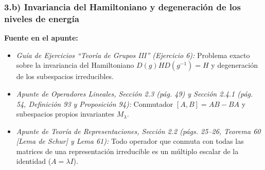 \documentclass[11pt, a4paper]{article}
\begin{document}
\subsubsection*{3.b) Invariancia del Hamiltoniano y degeneración de los niveles de energía}
\textbf{Fuente en el apunte:}
\begin{itemize}
    \item \textit{Guía de Ejercicios ``Teoría de Grupos III'' (Ejercicio 6):} Problema exacto sobre la invariancia del Hamiltoniano $D(g) H D(g^{-1}) = H$ y degeneración de los subespacios irreducibles.
    \item \textit{Apunte de Operadores Lineales, Sección 2.3 (pág. 49) y Sección 2.4.1 (pág. 54, Definición 93 y Proposición 94):} Conmutador $[A, B] = AB - BA$ y subespacios propios invariantes $M_\lambda$.
    \item \textit{Apunte de Teoría de Representaciones, Sección 2.2 (págs. 25--26, Teorema 60 [Lema de Schur] y Lema 61):} Todo operador que conmuta con todas las matrices de una representación irreducible es un múltiplo escalar de la identidad ($A = \lambda I$).
\end{itemize}
\end{document}
